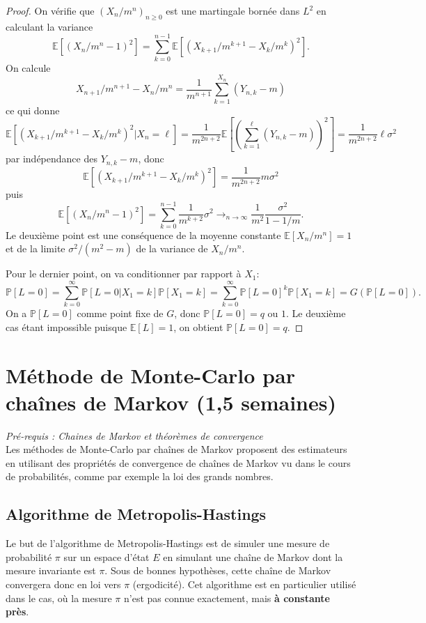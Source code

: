 \documentclass[a4paper,12pt]{book}
\begin{document}
\begin{proof}
On vérifie que $(X_n/m^n)_{n\geq 0}$ est une martingale bornée dans $L^2$ en calculant la variance
$$\mathbb{E}\left[(X_n/m^n-1)^2\right]=\sum_{k=0}^{n-1}\mathbb{E}[(X_{k+1}/m^{k+1}-X_k/m^k)^2].$$
On calcule
$$X_{n+1}/m^{n+1}-X_n/m^n=\frac{1}{m^{n+1}}\sum_{k=1}^{X_n}(Y_{n,k}-m)$$
ce qui donne
$$\mathbb{E}[(X_{k+1}/m^{k+1}-X_k/m^k)^2|X_n=\ell]=\frac{1}{m^{2n+2}}\mathbb{E}\left[\left(\sum_{k=1}^{\ell}(Y_{n,k}-m)\right)^2\right]=\frac{1}{m^{2n+2}}\ell\sigma^2$$
par indépendance des $Y_{n,k}-m$,
donc
$$\mathbb{E}[(X_{k+1}/m^{k+1}-X_k/m^k)^2]=\frac{1}{m^{2n+2}}m\sigma^2$$
puis
$$\mathbb{E}\left[(X_n/m^n-1)^2\right]=\sum_{k=0}^{n-1}\frac{1}{m^{k+2}}\sigma^2\to_{n\to \infty}\frac{1}{m^2}\frac{\sigma^2}{1-1/m}.$$
Le deuxième point est une conséquence de la moyenne constante $\mathbb{E}[X_n/m^n]=1$ et de la limite  $\sigma^2/(m^2-m)$ de la variance de $X_n/m^n$.

Pour le dernier point, on va conditionner par rapport à $X_1$:
$$\mathbb{P}[L=0]=\sum_{k=0}^\infty \mathbb{P}[L=0|X_1=k]\mathbb{P}[X_1=k]=\sum_{k=0}^\infty \mathbb{P}[L=0]^k\mathbb{P}[X_1=k]=G(\mathbb{P}[L=0]) .$$
On a $\mathbb{P}[L=0]$ comme point fixe de $G$, donc $\mathbb{P}[L=0]=q$ ou $1$. Le deuxième cas étant impossible puisque $\mathbb{E}[L]=1$, on obtient $\mathbb{P}[L=0]=q$.
\end{proof}




\chapter[MCMC ]{Méthode de Monte-Carlo par chaînes de Markov (1,5 semaines)}

\textit{Pré-requis : Chaines de Markov et théorèmes de convergence}\\

Les méthodes de Monte-Carlo par chaînes de Markov proposent des estimateurs en utilisant des propriétés de convergence de chaînes de Markov vu dans le cours de probabilités, comme par exemple la loi des grands nombres.


\section{Algorithme de Metropolis-Hastings}
Le but de l'algorithme de Metropolis-Hastings est de simuler une mesure de probabilité $\pi$ sur un espace d'état $E$ en simulant une chaîne de Markov dont la mesure invariante est $\pi$. Sous de bonnes hypothèses, cette chaîne de Markov convergera donc en loi vers $\pi$ (ergodicité). Cet algorithme est en particulier utilisé dans le cas, où la mesure $\pi$ n'est pas connue exactement, mais \textbf{à constante près}.
\end{document}
